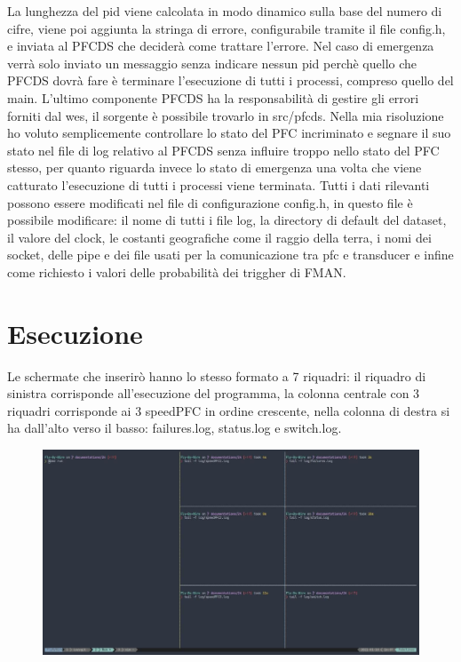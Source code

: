 \documentclass{article}
\begin{document}
\begin{flushleft}
La lunghezza del pid viene calcolata in modo dinamico sulla base del numero di cifre, viene poi aggiunta la stringa di errore, configurabile tramite il file config.h, e inviata al PFCDS che deciderà come trattare l'errore. Nel caso di emergenza verrà solo inviato un messaggio senza indicare nessun pid perchè quello che PFCDS dovrà fare è terminare l'esecuzione di tutti i processi, compreso quello del main. L'ultimo componente PFCDS ha la responsabilità di gestire gli errori forniti dal wes, il sorgente è possibile trovarlo in src/pfcds. Nella mia risoluzione ho voluto semplicemente controllare lo stato del PFC incriminato e segnare il suo stato nel file di log relativo al PFCDS senza influire troppo nello stato del PFC stesso, per quanto riguarda invece lo stato di emergenza una volta che viene catturato l'esecuzione di tutti i processi viene terminata. Tutti i dati rilevanti possono essere modificati nel file di configurazione config.h, in questo file è possibile modificare: il nome di tutti i file log, la directory di default del dataset, il valore del clock, le costanti geografiche come il raggio della terra, i nomi dei socket, delle pipe e dei file usati per la comunicazione tra pfc e transducer e infine come richiesto i valori delle probabilità dei triggher di FMAN.

\section{Esecuzione}

Le schermate che inserirò hanno lo stesso formato a 7 riquadri: il riquadro di sinistra corrisponde all'esecuzione del programma, la colonna centrale con 3 riquadri corrisponde ai 3 speedPFC in ordine crescente, nella colonna di destra si ha dall'alto verso il basso: failures.log, status.log e switch.log.

\begin{figure}[H]
\centering
\includegraphics[width=0.8\linewidth]{images/riquadri.jpg}
\end{figure}


\end{flushleft}
\end{document}
